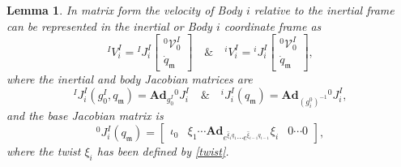 \documentclass[lettersize,journal]{IEEEtran}
\def \m  {\mathfrak{m}}
\def \Ad {\textbf{Ad}}
\newtheorem{lemma}{Lemma}
\theoremstyle{remark}
\begin{document}
\begin{lemma}
In matrix form the velocity of Body $i$ relative to the inertial frame can be represented in the inertial or Body $i$ coordinate frame as
\begin{equation}
{}^IV_i^I= {}^IJ^I_i\begin{bmatrix}^0\mathcal{V}^I_0\\\dot{q}_\mathfrak{m}\end{bmatrix} \quad \& \quad ^iV_i^I={}^iJ^I_i\begin{bmatrix}^0\mathcal{V}^I_0\\\dot{q}_\mathfrak{m}\end{bmatrix}, \label{bodyvelocity}
\end{equation}
where the inertial and body Jacobian matrices are
\begin{equation}
    ^IJ^I_i(g^I_0,q_\m)=\Ad_{g^I_0} {}^0J^I_i \quad \& \quad {}^iJ^I_i(q_\m)=\Ad_{(g^0_i)^{-1}}{}{}^0J^I_i,
    \label{bodyJacobian}
\end{equation}
and the base Jacobian matrix is
\begin{equation}
    ^0J^I_i(q_\m)=\begin{bmatrix} \iota_0  & {\xi}_{1}\cdots \Ad_{e^{\hat{\xi}_{1}q_{1}}\cdots e^{\hat{\xi}_{i-1}q_{i-1}}}{\xi}_i & 0\cdots 0\end{bmatrix},
    \label{baseJacobian}
\end{equation}
where the twist ${\xi}_i$ has been defined by \eqref{twist}.
\end{lemma}
\end{document}
